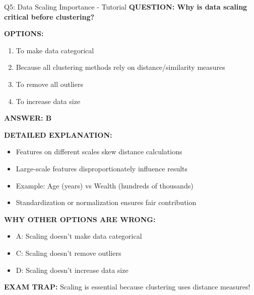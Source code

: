 \documentclass[8pt]{beamer}
\begin{document}
	\begin{frame}{Q5: Data Scaling Importance - Tutorial}
		\fontsize{6.5}{7.5}\selectfont
		\textbf{QUESTION: Why is data scaling critical before clustering?}
		
		\vspace{0.1cm}
		\textbf{OPTIONS:}
		\begin{enumerate}
			\item To make data categorical
			\item Because all clustering methods rely on distance/similarity measures
			\item To remove all outliers
			\item To increase data size
		\end{enumerate}
		
		\vspace{0.1cm}
		\textcolor{myblue}{\textbf{ANSWER: B}}
		
		\vspace{0.1cm}
		\textbf{DETAILED EXPLANATION:}
		\begin{itemize}
			\item Features on different scales skew distance calculations
			\item Large-scale features disproportionately influence results
			\item Example: Age (years) vs Wealth (hundreds of thousands)
			\item Standardization or normalization ensures fair contribution
		\end{itemize}
		
		\vspace{0.1cm}
		\textcolor{myred}{\textbf{WHY OTHER OPTIONS ARE WRONG:}}
		\begin{itemize}
			\item \textcolor{myred}{A:} Scaling doesn't make data categorical
			\item \textcolor{myred}{C:} Scaling doesn't remove outliers
			\item \textcolor{myred}{D:} Scaling doesn't increase data size
		\end{itemize}
		
		\textcolor{myred}{\textbf{EXAM TRAP:}} Scaling is essential because clustering uses \textcolor{myblue}{distance measures}!
	\end{frame}
	
\end{document}
